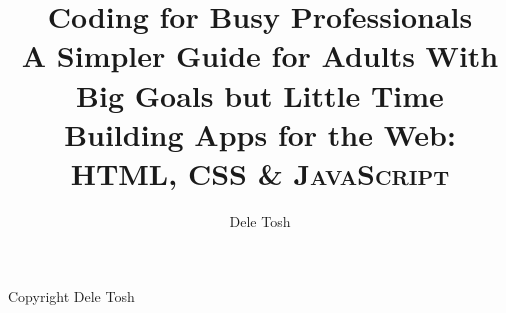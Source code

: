 \documentclass[titlepage]{book}
\title{%
    Coding for Busy Professionals \\
    \large A Simpler Guide for Adults With Big Goals but Little Time \\
    Building Apps for the Web: \textsc{HTML, CSS \& JavaScript}
}
\author{Dele Tosh}
\begin{document}
    \frontmatter
%
    \maketitle
    \thispagestyle{empty}
    Copyright  Dele Tosh
    \tableofcontents

    \mainmatter
    
    
    
    
    

    \printbibliography
\end{document}
